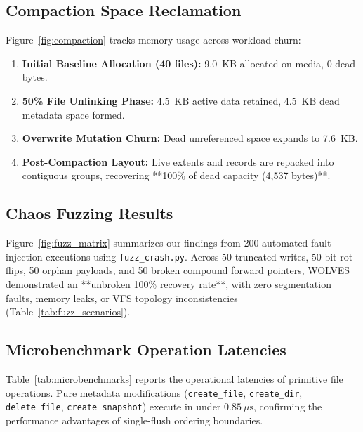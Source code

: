 \documentclass[conference]{IEEEtran}
\begin{document}
\subsection{Compaction Space Reclamation}
Figure~\ref{fig:compaction} tracks memory usage across workload churn:
\begin{enumerate}
    \item \textbf{Initial Baseline Allocation (40 files):} 9.0~KB allocated on media, 0 dead bytes.
    \item \textbf{50\% File Unlinking Phase:} 4.5~KB active data retained, 4.5~KB dead metadata space formed.
    \item \textbf{Overwrite Mutation Churn:} Dead unreferenced space expands to 7.6~KB.
    \item \textbf{Post-Compaction Layout:} Live extents and records are repacked into contiguous groups, recovering **100\% of dead capacity (4,537 bytes)**.
\end{enumerate}

\subsection{Chaos Fuzzing Results}
Figure~\ref{fig:fuzz_matrix} summarizes our findings from 200 automated fault injection executions using \texttt{fuzz\_crash.py}. Across 50 truncated writes, 50 bit-rot flips, 50 orphan payloads, and 50 broken compound forward pointers, WOLVES demonstrated an **unbroken 100\% recovery rate**, with zero segmentation faults, memory leaks, or VFS topology inconsistencies (Table~\ref{tab:fuzz_scenarios}).

\subsection{Microbenchmark Operation Latencies}
Table~\ref{tab:microbenchmarks} reports the operational latencies of primitive file operations. Pure metadata modifications (\texttt{create\_file}, \texttt{create\_dir}, \texttt{delete\_file}, \texttt{create\_snapshot}) execute in under $0.85~\mu\text{s}$, confirming the performance advantages of single-flush ordering boundaries.
\end{document}
